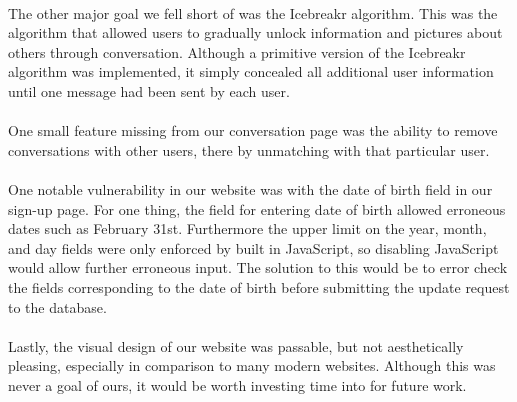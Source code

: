 \documentclass{article}
\begin{document}
    \paragraph{}
    The other major goal we fell short of was the Icebreakr algorithm. This was the algorithm that allowed users to gradually unlock information and pictures about others through conversation. Although a primitive version of the Icebreakr algorithm was implemented, it simply concealed all additional user information until one message had been sent by each user.
    \paragraph{}
    One small feature missing from our conversation page was the ability to remove conversations with other users, there by unmatching with that particular user.
    \paragraph{}
    One notable vulnerability in our website was with the date of birth field in our sign-up page. For one thing, the field for entering date of birth allowed erroneous dates such as February 31st. Furthermore the upper limit on the year, month, and day fields were only enforced by built in JavaScript, so disabling JavaScript would allow further erroneous input. The solution to this would be to error check the fields corresponding to the date of birth before submitting the update request to the database.
    \paragraph{}
    Lastly, the visual design of our website was passable, but not aesthetically pleasing, especially in comparison to many modern websites. Although this was never a goal of ours, it would be worth investing time into for future work.
\end{document}
